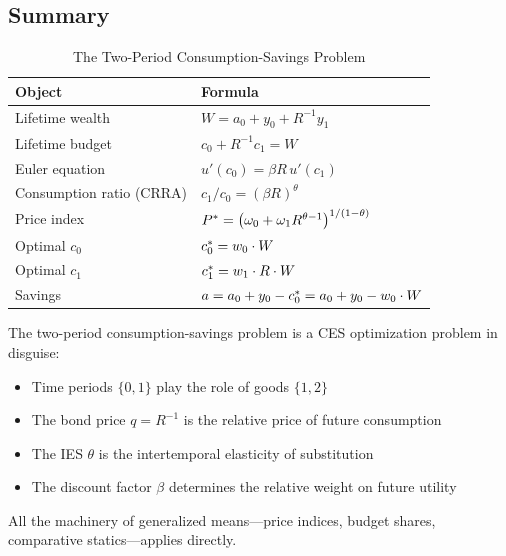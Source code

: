 \subsection{Summary}
\label{subsec:two-period-summary}

\begin{table}[H]
\centering
\caption{The Two-Period Consumption-Savings Problem}
\label{tab:two-period-summary}
\renewcommand{\arraystretch}{1.6}
\begin{tabular}{@{}ll@{}}
\toprule
\textbf{Object} & \textbf{Formula} \\
\midrule
Lifetime wealth & $W = a_0 + y_0 + R^{-1} y_1$ \\[6pt]
Lifetime budget & $c_0 + R^{-1} c_1 = W$ \\[6pt]
Euler equation & $u'(c_0) = \beta R \, u'(c_1)$ \\[6pt]
Consumption ratio (CRRA) & $c_1 / c_0 = (\beta R)^{\theta}$ \\[6pt]
Price index & $P^{*} = \left( \omega_0 + \omega_1 R^{\theta-1} \right)^{1/(1-\theta)}$ \\[6pt]
Optimal $c_0$ & $c_0^* = w_0 \cdot W$ \\[6pt]
Optimal $c_1$ & $c_1^* = w_1 \cdot R \cdot W$ \\[6pt]
Savings & $a = a_0 + y_0 - c_0^* = a_0 + y_0 - w_0 \cdot W$ \\[6pt]
\bottomrule
\end{tabular}
\end{table}

\begin{callouttip}
The two-period consumption-savings problem is a CES optimization problem in disguise:
\begin{itemize}[nosep]
\item Time periods $\{0, 1\}$ play the role of goods $\{1, 2\}$
\item The bond price $q = R^{-1}$ is the relative price of future consumption
\item The IES $\theta$ is the intertemporal elasticity of substitution
\item The discount factor $\beta$ determines the relative weight on future utility
\end{itemize}
All the machinery of generalized means---price indices, budget shares, comparative statics---applies directly.
\end{callouttip}
